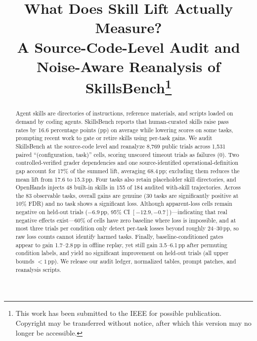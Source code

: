 \documentclass[10pt,conference]{IEEEtran}
\newif\ifsaveline \savelinetrue
\begin{document}
\title{What Does Skill Lift Actually Measure?\\ A Source-Code-Level Audit and\\ Noise-Aware Reanalysis of SkillsBench\thanks{This work has been submitted to the IEEE for possible publication. Copyright may be transferred without notice, after which this version may no longer be accessible.}}

\author{
\and
{}
}

\savelinefalse
\maketitle
\savelinetrue

\begin{abstract}
Agent skills are directories of instructions, reference materials, and scripts loaded on demand by coding agents. SkillsBench reports that human-curated skills raise pass rates by 16.6 percentage points (pp) on average while lowering scores on some tasks, prompting recent work to gate or retire skills using per-task gains. We audit SkillsBench at the source-code level and reanalyze 8,769 public trials across 1,531 paired ``(configuration, task)'' cells, scoring unscored timeout trials as failures (0). Two controlled-verified grader dependencies and one source-identified operational-definition gap account for 17\% of the summed lift, averaging 68.4\,pp; excluding them reduces the mean lift from 17.6 to 15.3\,pp. Four tasks also retain placeholder skill directories, and OpenHands injects 48 built-in skills in 155 of 184 audited with-skill trajectories. Across the 83 observable tasks, overall gains are genuine (30 tasks are significantly positive at 10\% FDR) and no task shows a significant loss. Although apparent-loss cells remain negative on held-out trials ($-6.9$\,pp, 95\% CI $[-12.9,-0.7]$)---indicating that real negative effects exist---60\% of cells have zero baseline where loss is impossible, and at most three trials per condition only detect per-task losses beyond roughly 24--30\,pp, so raw loss counts cannot identify harmed tasks. Finally, baseline-conditioned gates appear to gain 1.7--2.8\,pp in offline replay, yet still gain 3.5--6.1\,pp after permuting condition labels, and yield no significant improvement on held-out trials (all upper bounds $<1$\,pp). We release our audit ledger, normalized tables, prompt patches, and reanalysis scripts.
\end{abstract}
\end{document}
